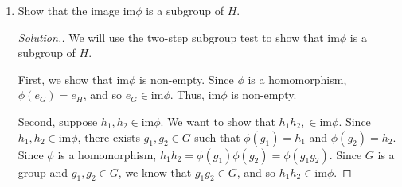\documentclass{article}
\newcommand{\sk}{\smallskip}
\begin{document}
\begin{enumerate}
\begin{enumerate}
\begin{proof}[Solution.]
            \sk

            First, since $\phi$ is a homomorphism, $\phi(e_G) = e_H$, and so $e_G \in ker \phi$, so $\ker \phi$ is non-empty. 

            \sk

            Second, suppose $a, b \in \ker \phi$. We want to show that $a^{-1} \in \ker \phi$ and $ab \in \ker \phi$. Since $a \in \ker \phi$, $\phi(a) = e_h$. Taking the inverse of both sides, we get $\phi(a)^{-1} = e_H^{-1} = e_H$. Since $\phi$ is a homomorphism, $\phi(a)^{-1} = \phi(a^{-1} = e_H$, so $\phi(a) \in \ker \phi$. Then, since $a, b \in \ker \phi$ and since $\phi$ is a homomorphism, $e_H = e_He_H = \phi(a)\phi(b) = \phi(ab)$, and so $ab \in \ker \phi$. Thus, $\ker \phi$ is a subgroup. 

            \sk

            Now, we want to show that $a \ker \phi = \ker \phi a$ for all $a \in G$. Suppose that $ak = \in a \ker \phi$ where $k \in \ker \phi$. We want to show that $ak \in \ker \phi a$, which is equivalent to showing that $aka^{-1} \in \ker \phi$. If we apply $\phi$ to $aka^{-1}$, we get $\phi(aka^{-1}) = \phi(a)\phi(k)\phi(a^{-1}) = \phi(a)\phi(a^{-1}) = e_H$. Thus, $aka^{-1} \in \ker \phi$, and so $ak \in \ker \phi a$, and $a \ker \phi \subset \ker \phi a$. The proof that $\ker \phi a \subset a \ker \phi$ is analogous, and so $a \ker \phi = \ker \phi a$ for all $a \in G$. 

            \sk

            Since $\ker \phi$ is a subgroup and satisfies $a \ker \phi = \ker \phi a$ for all $a \in G$, $\ker \phi$ is a normal subgroup of $G$.
        \end{proof}
        
        \item Show that the image $\text{im} \phi$ is a subgroup of $H$. 

        \begin{proof}[Solution.]

        We will use the two-step subgroup test to show that  $\text{im} \phi$ is a subgroup of $H$. 

        \sk 

        First, we show that $\text{im} \phi$ is non-empty. Since $\phi$ is a homomorphism, $\phi(e_G) = e_H$, and so $e_G \in \text{im}\phi$. Thus, $\text{im}\phi$ is non-empty. 

        \sk

        Second, suppose $h_1, h_2 \in \text{im}\phi$. We want to show that $h_1h_2, \in \text{im}\phi$. Since $h_1, h_2 \in \text{im}\phi$, there exists $g_1, g_2 \in G$ such that $\phi(g_1) = h_1$ and $\phi(g_2) = h_2$. Since $\phi$ is a homomorphism, $h_1h_2 = \phi(g_1)\phi(g_2) = \phi(g_1g_2)$. Since $G$ is a group and $g_1, g_2 \in G$, we know that $g_1g_2 \in G$, and so $h_1h_2 \in \text{im}\phi$. 


\end{proof}
\end{enumerate}
\end{enumerate}
\end{document}
